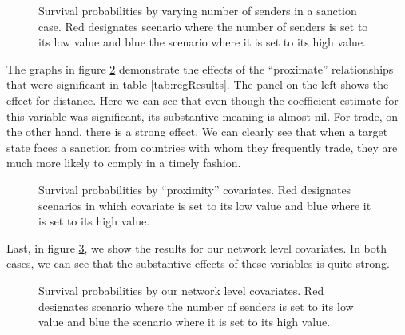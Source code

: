 \begin{figure}[ht]
	\centering
	\caption{Survival probabilities by varying number of senders in a sanction case. Red designates scenario where the number of senders is set to its low value and blue the scenario where it is set to its high value.}
	\resizebox{0.7\textwidth}{!}{}
	\label{fig:surv1}
\end{figure}
\FloatBarrier

The graphs in figure \ref{fig:surv2} demonstrate the effects of the ``proximate'' relationships that were significant in table \ref{tab:regResults}. The panel on the left shows the effect for distance. Here we can see that even though the coefficient estimate for this variable was significant, its substantive meaning is almost nil. For trade, on the other hand, there is a strong effect. We can clearly see that when a target state faces a sanction from countries with whom they frequently trade, they are much more likely to comply in a timely fashion.

\begin{figure}[ht]
	\centering
	\caption{Survival probabilities by ``proximity'' covariates. Red designates scenarios in which covariate is set to its low value and blue where it is set to its high value.}
	\resizebox{1\textwidth}{!}{}	
	\label{fig:surv2}
\end{figure}
\FloatBarrier

Last, in figure \ref{fig:surv3}, we show the results for our network level covariates. In both cases, we can see that the substantive effects of these variables is quite strong. 

\begin{figure}[ht]
	\centering
	\caption{Survival probabilities by our network level covariates. Red designates scenario where the number of senders is set to its low value and blue the scenario where it is set to its high value.}
	\resizebox{1\textwidth}{!}{}	
	\label{fig:surv3}	
\end{figure}
\FloatBarrier